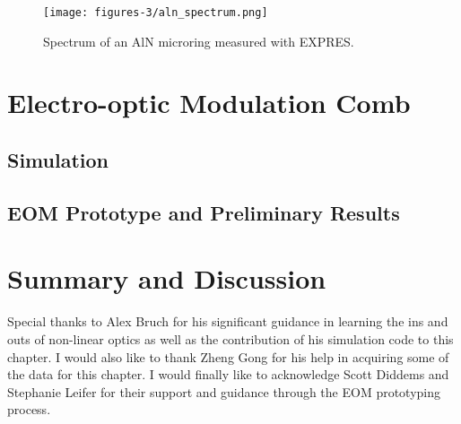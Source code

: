 \begin{figure}
    \centering
    \texttt{[image: figures-3/aln\_spectrum.png]}
    \caption{Spectrum of an AlN microring measured with EXPRES.}
    \label{fig:aln_spectrum}
\end{figure}

\section{Electro-optic Modulation Comb}

\subsection{Simulation}

\subsection{EOM Prototype and Preliminary Results}

\section{Summary and Discussion}


Special thanks to Alex Bruch for his significant guidance in learning the ins and outs of non-linear optics as well as the contribution of his simulation code to this chapter. I would also like to thank Zheng Gong for his help in acquiring some of the data for this chapter. I would finally like to acknowledge Scott Diddems and Stephanie Leifer for their support and guidance through the EOM prototyping process.